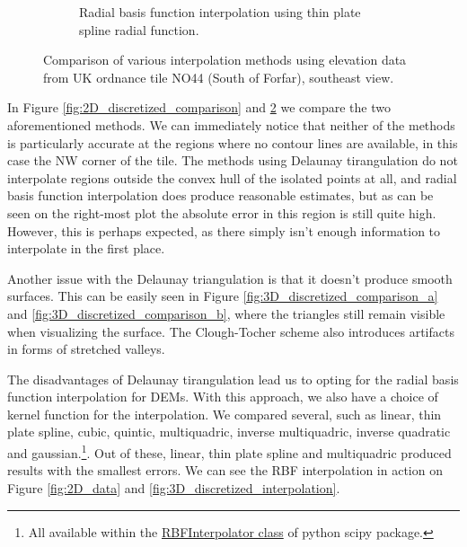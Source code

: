 \documentclass[a4paper,10pt]{report}
\begin{document}
\begin{figure}[H]
\begin{subfigure}{.32\textwidth}
    \caption{Radial basis function interpolation using thin plate spline radial function.}
    \label{fig:3D_discretized_comparison_c}
    \end{subfigure}
    \caption{Comparison of various interpolation methods using elevation data from UK ordnance tile NO44 (South of Forfar), southeast view.}
    \label{fig:3D_discretized_comparison}
\end{figure}

In Figure \ref{fig:2D_discretized_comparison} and \ref{fig:3D_discretized_comparison} we compare the two aforementioned methods. We can immediately notice that neither of the methods is particularly accurate at the regions where no contour lines are available, in this case the NW corner of the tile. The methods using Delaunay tirangulation do not interpolate regions outside the convex hull of the isolated points at all, and radial basis function interpolation does produce reasonable estimates, but as can be seen on the right-most plot the absolute error in this region is still quite high. However, this is perhaps expected, as there simply isn't enough information to interpolate in the first place.

Another issue with the Delaunay triangulation is that it doesn't produce smooth surfaces. This can be easily seen in Figure \ref{fig:3D_discretized_comparison_a} and \ref{fig:3D_discretized_comparison_b}, where the triangles still remain visible when visualizing the surface. The Clough-Tocher scheme also introduces artifacts in forms of stretched valleys.

The disadvantages of Delaunay tirangulation lead us to opting for the radial basis function interpolation for DEMs. With this approach, we also have a choice of kernel function for the interpolation. We compared several, such as linear, thin plate spline, cubic, quintic, multiquadric, inverse multiquadric, inverse quadratic and gaussian.\footnote{All available within the \href{https://docs.scipy.org/doc/scipy/reference/generated/scipy.interpolate.RBFInterpolator.html}{RBFInterpolator class} of python scipy package.}. Out of these, linear, thin plate spline and multiquadric produced results with the smallest errors. We can see the RBF interpolation in action on Figure \ref{fig:2D_data} and \ref{fig:3D_discretized_interpolation}.
\end{document}
